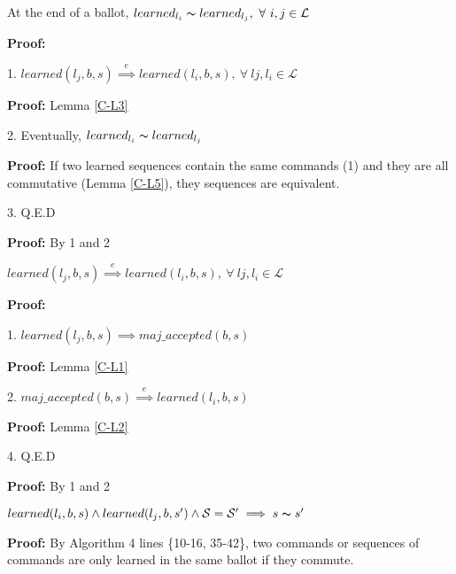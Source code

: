\begin{lemma}
At the end of a ballot, $learned_{l_i} \thicksim learned_{l_j},\ \forall\ i,j \in \mathcal{L}$ \label{C-L4} \par
\end{lemma}
\textbf{Proof:} \par
1.  $learned(l_j,b,s) \overset{e}{\implies} learned(l_i,b,s),\ \forall\ lj, l_i \in \mathcal{L}$\par
\indent\indent\textbf{Proof:} Lemma \ref{C-L3} \par
2. Eventually, $learned_{l_i} \thicksim learned_{l_j}$  \par
\indent\indent\textbf{Proof:} If two learned sequences contain the same commands (1) and they are all commutative (Lemma \ref{C-L5}), they sequences are equivalent.\par
3. Q.E.D \par
\indent\indent\textbf{Proof:} By 1 and 2\par

\begin{lemma}
	$learned(l_j,b,s) \overset{e}{\implies} learned(l_i,b,s),\ \forall\ lj, l_i \in \mathcal{L}$ \label{C-L3} \par
\end{lemma}
\textbf{Proof:} \par
1. $learned(l_j,b,s) \implies maj\_accepted(b,s)$\par
\indent\indent\textbf{Proof:} Lemma \ref{C-L1} \par
2. $maj\_accepted(b,s) \overset{e}{\implies} learned(l_i,b,s)$ \par
\indent\indent\textbf{Proof:} Lemma \ref{C-L2} \par
4. Q.E.D \par
\indent\indent\textbf{Proof:} By 1 and 2\par


\begin{lemma}
$learned(l_i,b,s) \land learned(l_j,b,s') \land \mathcal{S} = \mathcal{S'} \implies s \thicksim s'$  \label{C-L5} \par
\end{lemma}
\textbf{Proof:} By Algorithm 4 lines \{10-16, 35-42\}, two commands or sequences of commands are only learned in the same ballot if they commute.



